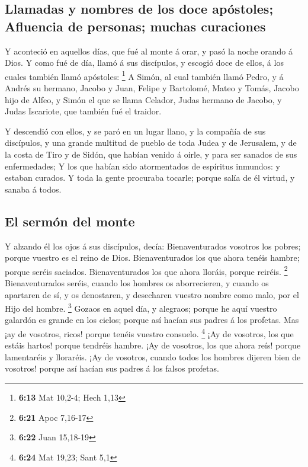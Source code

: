 \hypertarget{llamadas-y-nombres-de-los-doce-apuxf3stoles-afluencia-de-personas-muchas-curaciones}{%
\subsection{Llamadas y nombres de los doce apóstoles; Afluencia de
personas; muchas
curaciones}\label{llamadas-y-nombres-de-los-doce-apuxf3stoles-afluencia-de-personas-muchas-curaciones}}

 Y aconteció en aquellos días, que fué al monte á orar, y
pasó la noche orando á Dios.  Y como fué de día, llamó á
sus discípulos, y escogió doce de ellos, á los cuales también llamó
apóstoles: \footnote{\textbf{6:13} Mat 10,2-4; Hech 1,13}
 A Simón, al cual también llamó Pedro, y á Andrés su
hermano, Jacobo y Juan, Felipe y Bartolomé,  Mateo y
Tomás, Jacobo hijo de Alfeo, y Simón el que se llama Celador,
 Judas hermano de Jacobo, y Judas Iscariote, que también
fué el traidor.

 Y descendió con ellos, y se paró en un lugar llano, y la
compañía de sus discípulos, y una grande multitud de pueblo de toda
Judea y de Jerusalem, y de la costa de Tiro y de Sidón, que habían
venido á oirle, y para ser sanados de sus enfermedades; 
Y los que habían sido atormentados de espíritus inmundos: y estaban
curados.  Y toda la gente procuraba tocarle; porque salía
de él virtud, y sanaba á todos.

\hypertarget{el-sermuxf3n-del-monte}{%
\subsection{El sermón del monte}\label{el-sermuxf3n-del-monte}}

 Y alzando él los ojos á sus discípulos, decía:
Bienaventurados vosotros los pobres; porque vuestro es el reino de Dios.
 Bienaventurados los que ahora tenéis hambre; porque
seréis saciados. Bienaventurados los que ahora lloráis, porque reiréis.
\footnote{\textbf{6:21} Apoc 7,16-17}  Bienaventurados
seréis, cuando los hombres os aborrecieren, y cuando os apartaren de sí,
y os denostaren, y desecharen vuestro nombre como malo, por el Hijo del
hombre. \footnote{\textbf{6:22} Juan 15,18-19}  Gozaos en
aquel día, y alegraos; porque he aquí vuestro galardón es grande en los
cielos; porque así hacían sus padres á los profetas.  Mas
¡ay de vosotros, ricos! porque tenéis vuestro consuelo. \footnote{\textbf{6:24}
  Mat 19,23; Sant 5,1}  ¡Ay de vosotros, los que estáis
hartos! porque tendréis hambre. ¡Ay de vosotros, los que ahora reís!
porque lamentaréis y lloraréis.  ¡Ay de vosotros, cuando
todos los hombres dijeren bien de vosotros! porque así hacían sus padres
á los falsos profetas.

